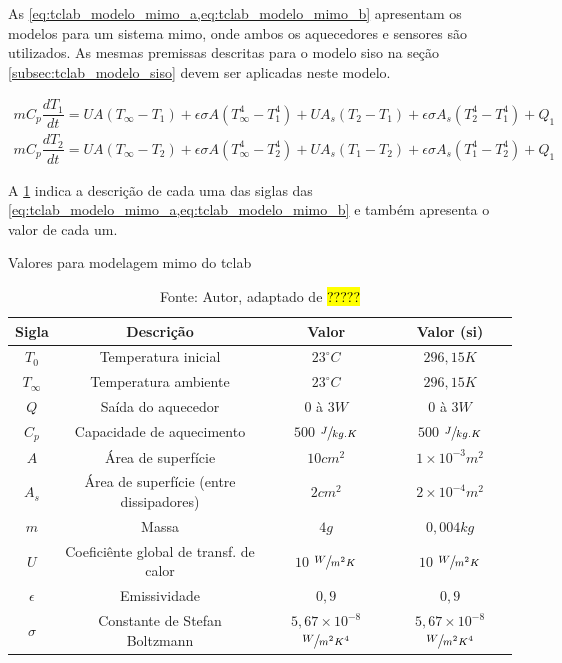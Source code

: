 As \cref{eq:tclab_modelo_mimo_a,eq:tclab_modelo_mimo_b} apresentam os modelos
para um sistema \acrshort{mimo}, onde ambos os aquecedores e sensores são utilizados.
As mesmas premissas descritas para o modelo \acrshort{siso} na seção \ref{subsec:tclab_modelo_siso}
devem ser aplicadas neste modelo.

\begin{subequations}
	\label{eq:tclab_modelo_mimo}
	\begin{gather}
		mC_p \dfrac{dT_1}{dt} = UA (T_{\infty} - T_1) + \epsilon \sigma A (T_{\infty}^{4} - T_{1}^{4}) + UA_s (T_2 - T_1) + \epsilon \sigma A_s (T_{2}^{4} - T_{1}^{4}) + Q_1		\label{eq:tclab_modelo_mimo_a} \\
		mC_p \dfrac{dT_2}{dt} = UA (T_{\infty} - T_2) + \epsilon \sigma A (T_{\infty}^{4} - T_{2}^{4}) + UA_s (T_1 - T_2) + \epsilon \sigma A_s (T_{1}^{4} - T_{2}^{4}) + Q_1		\label{eq:tclab_modelo_mimo_b}
	\end{gather}
\end{subequations}

A \cref{tab:tclab_modelo_mimo_valores} indica a descrição de cada uma das siglas das
\cref{eq:tclab_modelo_mimo_a,eq:tclab_modelo_mimo_b} e também apresenta o valor de cada um.

\begin{table}[h]
	\centering
	\caption{Valores para modelagem \acrshort{mimo} do \acrshort{tclab}}
	\label{tab:tclab_modelo_mimo_valores}
	\begin{tabular}{cccc} \toprule
		{Sigla} 		& {Descrição} 								& {Valor} 											& {Valor (\acrshort{si})} 							\\ \midrule
		$T_{0}$ 		& Temperatura inicial 						& $23^\circ C$ 										& $296{,}15 K $										\\
		$T_{\infty}$	& Temperatura ambiente						& $23^\circ C$										& $296{,}15 K $										\\
		$Q$				& Saída do aquecedor						& $0$ à $3 W$										& $0$ à $3 W$										\\
		$C_p$			& Capacidade de aquecimento					& $500$ $\sfrac{J}{kg.K}$							& $500$ $\sfrac{J}{kg.K}$							\\
		$A$				& Área de superfície						& $10 cm^{2}$										& $1{\times}10^{-3} m^{2}$							\\
		$A_s$			& Área de superfície (entre dissipadores)	& $2 cm^{2}$										& $2{\times}10^{-4} m^{2}$							\\
		$m$				& Massa										& $4 g$												& $0{,}004 kg	$									\\
		$U$				& Coeficiênte global de transf. de calor	& $10$ $\sfrac{W}{m^{2}K}$							& $10$ $\sfrac{W}{m^{2}K}$							\\
		$\epsilon$		& Emissividade								& $0{,}9$											& $0{,}9$											\\
		$\sigma$		& Constante de Stefan Boltzmann				& $5{,}67{\times}10^{-8}$ $\sfrac{W}{m^{2}K^{4}}$	& $5{,}67{\times}10^{-8}$ $\sfrac{W}{m^{2}K^{4}}$	\\ \bottomrule
	\end{tabular}
	\caption*{Fonte: Autor, adaptado de \hl{?????}}		%
\end{table}